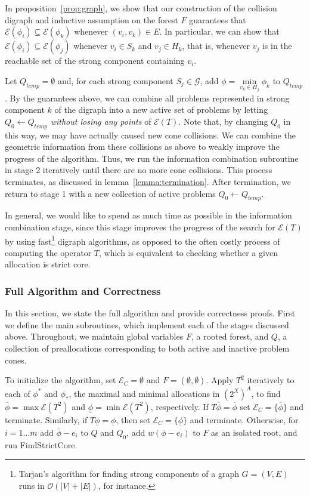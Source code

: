 \documentclass[11pt,reqno]{amsart}
\theoremstyle{definition}
\numberwithin{equation}{section}
\newcommand{\ol}{\overline}
\newcommand{\ul}{\underline}
\newcommand{\pre}{\phi}
\newcommand{\prealloc}{(2^X)^A}
\newcommand{\sub}{\subseteq}
\newcommand{\fix}{\mathcal{E}}
\newcommand{\toppre}{\ol{\pre}}
\newcommand{\strongc}{\mathcal{G}}
\newcommand{\strongcomp}{S}
\newcommand{\acto}{Q_0}
\newcommand{\act}{Q}
\newcommand{\actt}{Q_{temp}}
\newcommand{\reach}{H}
\newcommand{\forest}{F}
\newcommand{\fixfind}{\mathcal{E}_C}
\begin{document}
In proposition~\ref{prop:graph}, we show that our construction of the collision digraph and inductive assumption on the forest $\forest$ guarantees that $\fix(\pre_i) \sub \fix(\pre_k)$ whenever $(v_i,v_k) \in E$. In particular, we can show that $\fix(\pre_i) \sub \fix(\pre_j)$ whenever $v_i \in \strongcomp_k$ and $v_j \in \reach_k$, that is, whenever $v_j$ is in the reachable set of the strong component containing $v_i$.

Let $\actt = \emptyset$ and, for each strong component $\strongcomp_j \in \strongc$, add $\pre = \min\limits_{v_k \in \reach_j} \pre_k$ to $\actt$.
By the guarantees above, we can combine all problems represented in strong component $k$ of the digraph into a new active set of problems by letting $\acto \leftarrow \actt$ \emph{without losing any points} of $\fix(T)$.
Note that, by changing $\acto$ in this way, we may have actually caused new cone collisions.
We can combine the geometric information from these collisions as above to weakly improve the progress of the algorithm.
Thus, we run the information combination subroutine in stage 2 iteratively until there are no more cone collisions.
This process terminates, as discussed in lemma~\ref{lemma:termination}.
After termination, we return to stage 1 with a new collection of active problems $\acto \leftarrow \actt$.

In general, we would like to spend as much time as possible in the information combination stage, since this stage improves the progress of the search for $\fix(T)$ by using fast\footnote{Tarjan's algorithm for finding strong components of a graph $G = (V,E)$ runs in $\mathcal{O}(|V| + |E|)$, for instance.} digraph algorithms, as opposed to the often costly process of computing the operator $T$, which is equivalent to checking whether a given allocation is strict core.  

\subsubsection{Full Algorithm and Correctness} \label{fullalgo}
In this section, we state the full algorithm and provide correctness proofs.
First we define the main subroutines, which implement each of the stages discussed above.
Throughout, we maintain global variables $\forest$, a rooted forest, and $\act$, a collection of preallocations corresponding to both active and inactive problem cones.

To initialize the algorithm, set $\fixfind = \emptyset$ and $F = (\emptyset,\emptyset)$. 
Apply $T^2$ iteratively to each of $\pre^*$ and $\pre_*$, the maximal and minimal allocations in $\prealloc$, to find $\toppre = \max \fix(T^2)$ and $\ul{\pre} = \min \fix(T^2)$, respectively.
If $T\toppre = \toppre$ set $\fixfind = \{\toppre\}$ and terminate.
Similarly, if $T\ul{\pre} = \ul{\pre}$, then set $\fixfind = \{\ul{\pre}\}$ and terminate. 
Otherwise, for $i = 1 \hdots m$ add $\toppre - e_i$ to $\act$ and $\acto$, add $w(\pre - e_i)$ to $F$ as an isolated root, and run FindStrictCore. 
\end{document}
